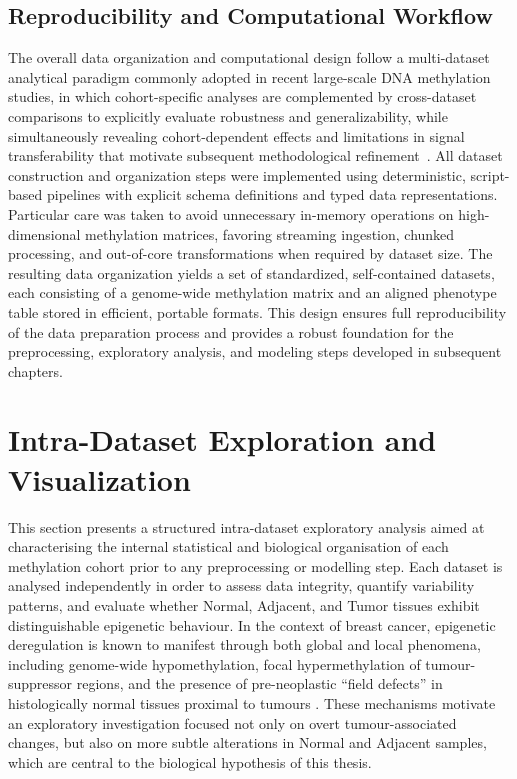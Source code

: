 \subsection{Reproducibility and Computational Workflow}

The overall data organization and computational design follow a multi-dataset analytical paradigm commonly adopted in recent large-scale DNA methylation studies, in which cohort-specific analyses are complemented by cross-dataset comparisons to explicitly evaluate robustness and generalizability, while simultaneously revealing cohort-dependent effects and limitations in signal transferability that motivate subsequent methodological refinement~\cite{Sokolov2024}.
All dataset construction and organization steps were implemented using deterministic, script-based pipelines with explicit schema definitions and typed data representations. Particular care was taken to avoid unnecessary in-memory operations on high-dimensional methylation matrices, favoring streaming ingestion, chunked processing, and out-of-core transformations when required by dataset size.
The resulting data organization yields a set of standardized, self-contained datasets, each consisting of a genome-wide methylation matrix and an aligned phenotype table stored in efficient, portable formats. This design ensures full reproducibility of the data preparation process and provides a robust foundation for the preprocessing, exploratory analysis, and modeling steps developed in subsequent chapters.

\section{Intra-Dataset Exploration and Visualization}
\label{sec:intra_dataset}

This section presents a structured intra-dataset exploratory analysis aimed at characterising the internal statistical and biological organisation of each methylation cohort prior to any preprocessing or modelling step. Each dataset is analysed independently in order to assess data integrity, quantify variability patterns, and evaluate whether Normal, Adjacent, and Tumor tissues exhibit distinguishable epigenetic behaviour.
In the context of breast cancer, epigenetic deregulation is known to manifest through both global and local phenomena, including genome-wide hypomethylation, focal hypermethylation of tumour-suppressor regions, and the presence of pre-neoplastic ``field defects'' in histologically normal tissues proximal to tumours \cite{ehrlich2002, bird2002, Teschendorff2016}. These mechanisms motivate an exploratory investigation focused not only on overt tumour-associated changes, but also on more subtle alterations in Normal and Adjacent samples, which are central to the biological hypothesis of this thesis.

